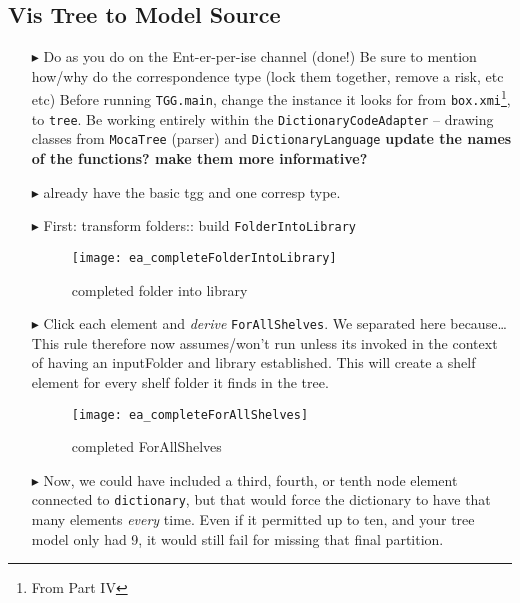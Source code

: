 \newpage
\hypertarget{treeToModel vis}{}
\subsection{Vis Tree to Model Source}
\visHeader

\begin{itemize}

\item[$\blacktriangleright$] Do as you do on the Ent-er-per-ise channel (done!)
Be sure to mention how/why do the correspondence type (lock them together, remove a risk, etc etc)
Before running \texttt{TGG.main}, change the instance it looks for from \texttt{box.xmi}\footnote{From Part IV}, to \texttt{tree}.
Be working entirely within the \texttt{DictionaryCodeAdapter} -- drawing classes from \texttt{MocaTree} (parser) and \texttt{DictionaryLanguage}
{\bf update the names of the functions? make them more informative?}


\item[$\blacktriangleright$] already have the basic tgg and one corresp type.

\item[$\blacktriangleright$] First: transform folders:: build \texttt{FolderIntoLibrary}

\begin{figure}[htbp]
\begin{center}
  \texttt{[image: ea\_completeFolderIntoLibrary]}
  \caption{completed folder into library}
  \label{ea:FolderIntoLibrary_Complete}
\end{center}
\end{figure}

\item[$\blacktriangleright$] Click each element and \emph{derive} \texttt{ForAllShelves}. We separated here because\ldots This rule therefore now assumes/won't
run unless its invoked in the context of having an inputFolder and library established. This will create a shelf element for every shelf folder it finds in the tree.

\begin{figure}[htbp]
\begin{center}
  \texttt{[image: ea\_completeForAllShelves]}
  \caption{completed ForAllShelves}
  \label{ea:ForAllShelves_Complete}
\end{center}
\end{figure}

\item[$\blacktriangleright$] Now, we could have included a third, fourth, or tenth node element connected to \texttt{dictionary}, but that would force the
dictionary to have that many elements \emph{every} time. Even if it permitted up to ten, and your tree model only had 9, it would still fail for missing that
final partition.


\end{itemize}
